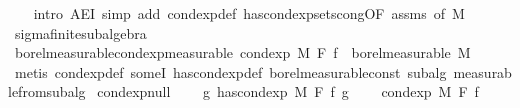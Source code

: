 \begin{isabellebody}
%
\isadelimproof
\ \ %
\endisadelimproof
%
\isatagproof
{}\isamarkupfalse%
\ {\isacharparenleft}{\kern0pt}intro\ AE{\isacharunderscore}{\kern0pt}I{}{\isacharcomma}{\kern0pt}\ simp\ add{\isacharcolon}{\kern0pt}\ cond{\isacharunderscore}{\kern0pt}exp{\isacharunderscore}{\kern0pt}def\ has{\isacharunderscore}{\kern0pt}cond{\isacharunderscore}{\kern0pt}exp{\isacharunderscore}{\kern0pt}sets{\isacharunderscore}{\kern0pt}cong{\isacharbrackleft}{\kern0pt}OF\ assms{\isacharcomma}{\kern0pt}\ of\ M{\isacharbrackright}{\kern0pt}{\isacharparenright}{\kern0pt}%
\endisatagproof
{\isafoldproof}%
%
\isadelimproof
\isanewline
%
\endisadelimproof
\isanewline
{}\isamarkupfalse%
\ sigma{\isacharunderscore}{\kern0pt}finite{\isacharunderscore}{\kern0pt}subalgebra\isanewline
{}\isanewline
\isanewline
{}\isamarkupfalse%
\ borel{\isacharunderscore}{\kern0pt}measurable{\isacharunderscore}{\kern0pt}cond{\isacharunderscore}{\kern0pt}exp{\isacharprime}{\kern0pt}{\isacharbrackleft}{\kern0pt}measurable{\isacharbrackright}{\kern0pt}{\isacharcolon}{\kern0pt}\ {\isachardoublequoteopen}cond{\isacharunderscore}{\kern0pt}exp\ M\ F\ f\ {\isasymin}\ borel{\isacharunderscore}{\kern0pt}measurable\ M{\isachardoublequoteclose}\isanewline
%
\isadelimproof
\ \ %
\endisadelimproof
%
\isatagproof
{}\isamarkupfalse%
\ {\isacharparenleft}{\kern0pt}metis\ cond{\isacharunderscore}{\kern0pt}exp{\isacharunderscore}{\kern0pt}def\ someI\ has{\isacharunderscore}{\kern0pt}cond{\isacharunderscore}{\kern0pt}exp{\isacharunderscore}{\kern0pt}def\ borel{\isacharunderscore}{\kern0pt}measurable{\isacharunderscore}{\kern0pt}const\ subalg\ measurable{\isacharunderscore}{\kern0pt}from{\isacharunderscore}{\kern0pt}subalg{\isacharparenright}{\kern0pt}%
\endisatagproof
{\isafoldproof}%
%
\isadelimproof
\isanewline
%
\endisadelimproof
\isanewline
{}\isamarkupfalse%
\ cond{\isacharunderscore}{\kern0pt}exp{\isacharunderscore}{\kern0pt}null{\isacharcolon}{\kern0pt}\ \isanewline
\ \ \ {\isachardoublequoteopen}{\isasymnexists}g{\isachardot}{\kern0pt}\ has{\isacharunderscore}{\kern0pt}cond{\isacharunderscore}{\kern0pt}exp\ M\ F\ f\ g{\isachardoublequoteclose}\ \isanewline
\ \ \ {\isachardoublequoteopen}cond{\isacharunderscore}{\kern0pt}exp\ M\ F\ f\ {\isacharequal}{\kern0pt}\ {\isacharparenleft}{\kern0pt}{\isasymlambda}{\isacharunderscore}{\kern0pt}{\isachardot}{\kern0pt}\ {}{\isacharparenright}{\kern0pt}{\isachardoublequoteclose}\isanewline
%
\isadelimproof
\ \ %
\endisadelimproof

\end{isabellebody}
